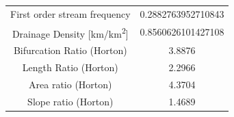 \documentclass[11pt,]{article}
\begin{document}
\begin{longtable}[]{@{}cc@{}}
\begin{minipage}[t]{0.65\columnwidth}
First order stream frequency\strut
\end{minipage} & \begin{minipage}[t]{0.29\columnwidth}\centering\strut
0.2882763952710843\strut
\end{minipage}\tabularnewline
\begin{minipage}[t]{0.65\columnwidth}\centering\strut
Drainage Density {[}km/km\textsuperscript{2}{]}\strut
\end{minipage} & \begin{minipage}[t]{0.29\columnwidth}\centering\strut
0.8560626101427108\strut
\end{minipage}\tabularnewline
\begin{minipage}[t]{0.65\columnwidth}\centering\strut
Bifurcation Ratio (Horton)\strut
\end{minipage} & \begin{minipage}[t]{0.29\columnwidth}\centering\strut
3.8876\strut
\end{minipage}\tabularnewline
\begin{minipage}[t]{0.65\columnwidth}\centering\strut
Length Ratio (Horton)\strut
\end{minipage} & \begin{minipage}[t]{0.29\columnwidth}\centering\strut
2.2966\strut
\end{minipage}\tabularnewline
\begin{minipage}[t]{0.65\columnwidth}\centering\strut
Area ratio (Horton)\strut
\end{minipage} & \begin{minipage}[t]{0.29\columnwidth}\centering\strut
4.3704\strut
\end{minipage}\tabularnewline
\begin{minipage}[t]{0.65\columnwidth}\centering\strut
Slope ratio (Horton)\strut
\end{minipage} & \begin{minipage}[t]{0.29\columnwidth}\centering\strut
1.4689\strut
\end{minipage}\tabularnewline
\bottomrule
\end{longtable}
\end{document}

